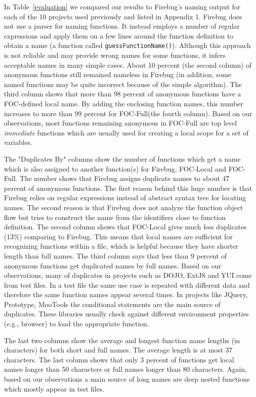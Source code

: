 \documentclass[10pt, preprint]{sigplanconf}
\begin{document}
In Table~\ref{evaluation} we compared our results to Firebug's naming output for each of the 10 projects used previously and listed in Appendix 1. Firebug does not use a parser for naming functions. It instead employs a number of regular expressions and apply them on a few lines around the function definition to obtain a name (a function called {\small \texttt{guessFunctionName()}}). Although this approach is not reliable and may provide wrong names for some functions, it infers acceptable names in many simple cases. About 10 percent (the second column) of anonymous functions still remained nameless in Firebug (in addition, some named functions may be quite incorrect because of the simple algorithm). The third column shows that more than 98 percent of anonymous functions have a FOC-defined local name. By adding the enclosing function names, this number increases to more than 99 percent for FOC-Full(the fourth column). Based on our observations, most functions remaining anonymous in FOC-Full are top level \textit{immediate} functions which are usually used for creating a local scope for a set of variables.

The "Duplicates By" columns show the number of functions which get a name which is also assigned to another function(s) for Firebug, FOC-Local and FOC-Full. The number shows that Firebug assigns duplicate names to about 47 percent of anonymous functions. The first reason behind this huge number is that Firebug relies on regular expressions instead of abstract syntax tree for locating names. The second reason is that Firebug does not analyze the function object flow but tries to construct the name from the identifiers close to function definition. The second column shows that FOC-Local gives much less duplicates (13\%) comparing to Firebug. This means that local names are sufficient for recognizing functions within a file, which is helpful because they have shorter length than full names. The third column says that less than 9 percent of anonymous functions get duplicated names by full names. Based on our observations, many of duplicates in projects such as DOJO, ExtJS and YUI come from test files. In a test file the same use case is repeated with different data and therefore the same function names appear several times. In projects like JQuery, Prototype, MooTools the conditional statements are the main source of duplicates. These libraries usually check against different environment properties (e.g., browser) to load the appropriate function.

The last two columns show the average and longest function name lengths (in characters) for both short and full names. The average length is at most 37 characters. The last column shows that only 3 percent of functions get local names longer than 50 characters or full names longer than 80 characters. Again, based on our observations a main source of long names are deep nested functions which mostly appear in test files.
\end{document}
